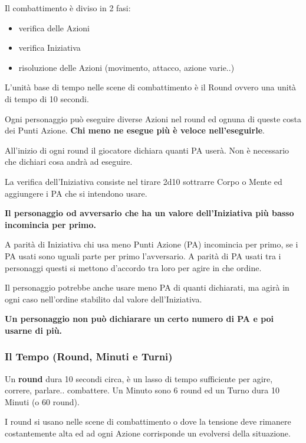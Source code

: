 \documentclass[12pt,a4paper,twoside,openany]{book}
\begin{document}
\begin{multicols}{2}
	
Il combattimento è diviso in 2 fasi:
\begin{itemize}
	\item verifica delle Azioni
	\item verifica Iniziativa
	\item risoluzione delle Azioni (movimento, attacco, azione varie..)
\end{itemize}

L'unità base di tempo nelle scene di combattimento è il Round ovvero una unità di tempo di 10 secondi.

Ogni personaggio può eseguire diverse Azioni nel round ed ognuna di queste costa dei Punti Azione. \textbf{Chi meno ne esegue più è veloce nell'eseguirle}.

All'inizio di ogni round il giocatore dichiara quanti PA userà. Non è necessario che dichiari cosa andrà ad eseguire.

La verifica dell'Iniziativa consiste nel tirare 2d10 sottrarre Corpo o Mente ed aggiungere i PA che si intendono usare.

\textbf{Il personaggio od avversario che ha un valore dell'Iniziativa più basso incomincia per primo.}

A parità di Iniziativa chi usa meno Punti Azione (PA) incomincia per primo, se i PA usati sono uguali parte per primo l'avversario.
A parità di PA usati tra i personaggi questi si mettono d'accordo tra loro per agire in che ordine.

Il personaggio potrebbe anche usare meno PA di quanti dichiarati, ma agirà in ogni caso nell'ordine stabilito dal valore dell'Iniziativa.

\textbf{Un personaggio non può dichiarare un certo numero di PA e poi usarne di più.}

\subsubsection{Il Tempo (Round, Minuti e Turni)}\label{iltempo}

Un \textbf{round} dura 10 secondi circa, è un lasso di tempo sufficiente per agire, correre, parlare.. combattere. Un Minuto sono 6 round ed un Turno dura 10 Minuti (o 60 round).

I round si usano nelle scene di combattimento o dove la tensione deve rimanere costantemente alta ed ad ogni Azione corrisponde un evolversi della situazione.


\end{multicols}
\end{document}
